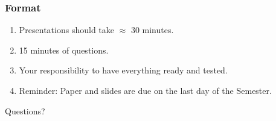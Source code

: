 \documentclass[xcolor={usenames,dvipsnames}]{beamer}
\begin{document}
\begin{frame}
	\frametitle{Format}
	\begin{enumerate}
		\item Presentations should take $\approx$ 30 minutes.
		\item 15 minutes of questions.
		\item Your responsibility to have everything ready and tested.
		\item Reminder: Paper and slides are due on the last day of the Semester.
	\end{enumerate}
\end{frame}




\begin{frame}
	\begin{center}
		{\huge Questions?}

	\end{center}
\end{frame}
\end{document}
